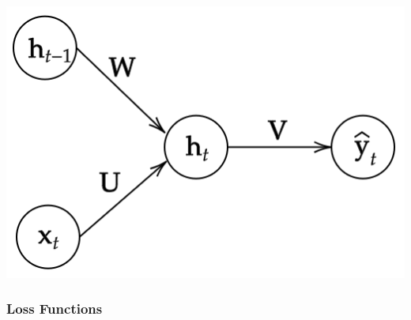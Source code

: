 \documentclass{article}
\theoremstyle{definition}
\theoremstyle{remark}
\theoremstyle{definition}
\begin{document}
\begin{center}
    \includegraphics[scale=0.3]{img/RNNs/RNN_as_MLP.png}
\end{center}

\subsubsection{Loss Functions}
\end{document}
